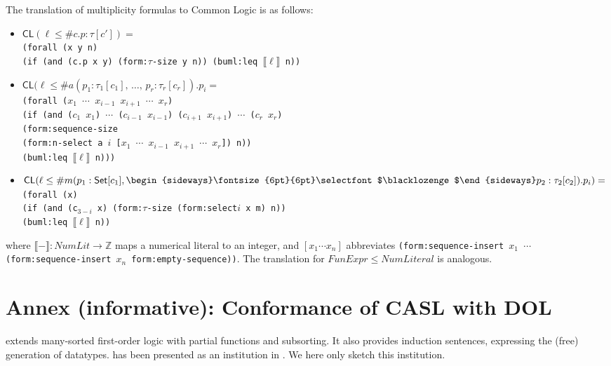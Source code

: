 \documentclass[10pt,fleqn,%
\ifpretendfinal
final%
\else
draft%
\fi,
]{scrreprt}
\newcommand*{\CL}{\ensuremath{\mathsf{CL}}\xspace}
\newcommand{\infannex}[1]{ \chapter{Annex (informative): #1} }
\newcommand{\composition}{\raisebox{0.2pt}{\begin{sideways}\fontsize{6pt}{6pt}\selectfont$\blacklozenge$\end{sideways}}}
\newcommand{\ZZ}{\mathbb{Z}}
\newcommand{\sem}[1]{\mathopen\llbracket#1\mathclose\rrbracket}
\newcommand{\white}[1]{{\color{white}{#1}}}
\newcommand{\qqquad}{\white{x}\qquad}
\begin{document}
The translation of multiplicity formulas to Common Logic is as follows:
\begin{itemize}
  \item  $\CL(\ell \leq \mathsf{\#}c\mathsf{.}p \mathrel{\mathsf{:}} \tau[c']) =$\\
\texttt{(forall (x y n)}\\
\qqquad\texttt{(if (and (c.p x y) (form:$\tau$-size y n)) (buml:leq $\sem{\ell}$ n))}
  \item $\CL(\ell \leq \mathsf{\#}a(p_1 \mathrel{\mathsf{:}} \tau_1[c_1]\mathsf{,}\, \dots\mathsf{,}\, p_r \mathrel{\mathsf{:}} \tau_r[c_r])\mathsf{.}p_i=$\\
\texttt{(forall ($x_1$ $\cdots$ $x_{i-1}$ $x_{i+1}$ $\cdots$ $x_r$)}\\
\qqquad\texttt{(if (and ($c_1$ $x_1$) $\cdots$ ($c_{i-1}$ $x_{i-1}$) ($c_{i+1}$ $x_{i+1}$) $\cdots$ ($c_r$ $x_r$)\\
\qqquad\qqquad\qqquad  (form:sequence-size \\
\qqquad\qqquad\qqquad\qqquad(form:n-select a $i$ [$x_1$ $\cdots$ $x_{i-1}$ $x_{i+1}$ $\cdots$ $x_r$]) n))\\
\qqquad\qqquad (buml:leq $\sem{\ell}$ n)))}
  \item  $\CL(\ell \leq \mathsf{\#}m(p_1 \mathrel{\mathsf{:}} \mathsf{Set}[c_1]\mathsf{,}\, \composition p_2 \mathrel{\mathsf{:}} \tau_2[c_2])\mathsf{.}p_i)=$\\
\texttt{(forall (x)}\\
\qqquad\texttt{(if (and (c$_{3-i}$ x) (form:$\tau$-size (form:select$i$ x m) n))\\
\qqquad\qqquad (buml:leq $\sem{\ell}$ n))}
\end{itemize}
%
where $\sem{-} : \mathit{NumLit} \to \ZZ$ maps a numerical literal
to an integer, and $[x_1\cdots x_n]$ abbreviates \texttt{(form:sequence-insert $x_1$ $\cdots$ (form:sequence-insert $x_n$ form:empty-sequence))}.
The translation for  $\mathit{FunExpr} \leq \mathit{NumLiteral}$
is analogous.




\infannex{Conformance of CASL with DOL}\label{a:casl}


\CASL \cite{CASL-RM} extends many-sorted first-order logic with
partial functions and subsorting.  It also provides induction
sentences, expressing the (free) generation of datatypes.  \CASL has
been presented as an institution in \cite{Mossakowski02,CASL-RM}. We
here only sketch this institution.
\end{document}
